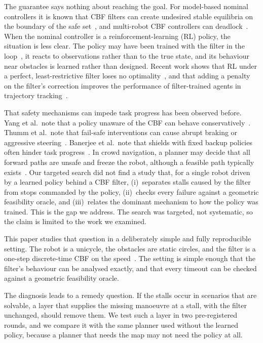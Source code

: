\documentclass[11pt]{article}
\theoremstyle{definition}
\theoremstyle{remark}
\begin{document}
The guarantee says nothing about reaching the goal. For model-based nominal controllers it is known that CBF filters can create undesired stable equilibria on the boundary of the safe set~\cite{reis2021undesired,tan2024undesired}, and multi-robot CBF controllers can deadlock~\cite{grover2023deadlock,jankovic2024liveness,chandra2025deadlock}. When the nominal controller is a reinforcement-learning (RL) policy, the situation is less clear. The policy may have been trained with the filter in the loop~\cite{pizarro2025filtering,yang2026cbfrl,krasowski2023provably}, it reacts to observations rather than to the true state, and its behaviour near obstacles is learned rather than designed. Recent work shows that RL under a perfect, least-restrictive filter loses no optimality~\cite{oh2026optimal}, and that adding a penalty on the filter's correction improves the performance of filter-trained agents in trajectory tracking~\cite{pizarro2025filtering}.

That safety mechanisms can impede task progress has been observed before. Yang et al.\ note that a policy unaware of the CBF can behave conservatively~\cite{yang2026cbfrl}. Thumm et al.\ note that fail-safe interventions can cause abrupt braking or aggressive steering~\cite{thumm2023reducing}. Banerjee et al.\ note that shields with fixed backup policies often hinder task progress~\cite{banerjee2024dmps}. In crowd navigation, a planner may decide that all forward paths are unsafe and freeze the robot, although a feasible path typically exists~\cite{trautman2010unfreezing}. Our targeted search did not find a study that, for a single robot driven by a learned policy behind a CBF filter, (i)~separates stalls caused by the filter from stops commanded by the policy, (ii)~checks every failure against a geometric feasibility oracle, and (iii)~relates the dominant mechanism to how the policy was trained. This is the gap we address. The search was targeted, not systematic, so the claim is limited to the work we examined.

This paper studies that question in a deliberately simple and fully reproducible setting. The robot is a unicycle, the obstacles are static circles, and the filter is a one-step discrete-time CBF on the speed~\cite{agrawal2017discrete}. The setting is simple enough that the filter's behaviour can be analysed exactly, and that every timeout can be checked against a geometric feasibility oracle.

The diagnosis leads to a remedy question. If the stalls occur in scenarios that are solvable, a layer that supplies the missing manoeuvre at a stall, with the filter unchanged, should remove them. We test such a layer in two pre-registered rounds, and we compare it with the same planner used without the learned policy, because a planner that needs the map may not need the policy at all.
\end{document}
